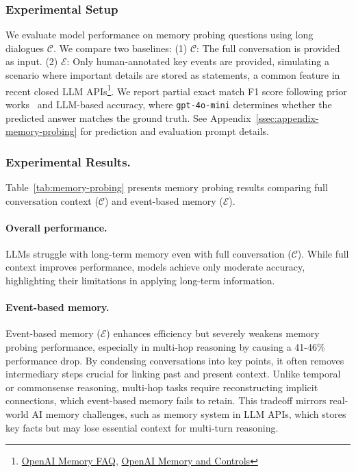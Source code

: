 \subsubsection{Experimental Setup}  
We evaluate model performance on memory probing questions using long dialogues \( \mathcal{C} \).  
We compare two baselines:  
(1) \( \mathcal{C} \): The full conversation is provided as input.  
(2) \( \mathcal{E} \): Only human-annotated key events are provided, simulating a scenario where important details are stored as statements, a common feature in recent closed LLM APIs\footnote{\href{https://help.openai.com/en/articles/8590148-memory-faq}{OpenAI Memory FAQ}, \href{https://openai.com/index/memory-and-new-controls-for-chatgpt}{OpenAI Memory and Controls}}.
We report partial exact match F1 score following prior works~\cite{kwiatkowski-etal-2019-natural, maharana-etal-2024-evaluating} and LLM-based accuracy, where \texttt{gpt-4o-mini} determines whether the predicted answer matches the ground truth.
See Appendix~\ref{ssec:appendix-memory-probing} for prediction and evaluation prompt details.

\subsubsection{Experimental Results.}  
Table~\ref{tab:memory-probing} presents memory probing results comparing full conversation context (\(\mathcal{C}\)) and event-based memory (\(\mathcal{E}\)).  

\paragraph{Overall performance.}  
LLMs struggle with long-term memory even with full conversation (\(\mathcal{C}\)). 
While full context improves performance, models achieve only moderate accuracy, highlighting their limitations in applying long-term information. 

\paragraph{Event-based memory.}  
Event-based memory (\(\mathcal{E}\)) enhances efficiency but severely weakens memory probing performance, especially in multi-hop reasoning by causing a 41-46\% performance drop.  
By condensing conversations into key points, it often removes intermediary steps crucial for linking past and present context.  
Unlike temporal or commonsense reasoning, multi-hop tasks require reconstructing implicit connections, which event-based memory fails to retain.  
This tradeoff mirrors real-world AI memory challenges, such as memory system in LLM APIs, which stores key facts but may lose essential context for multi-turn reasoning.  





